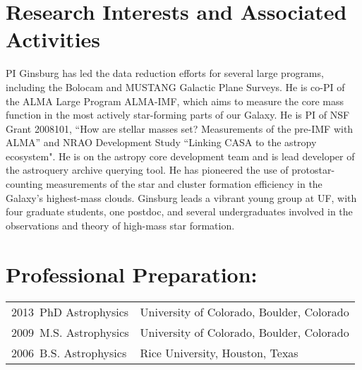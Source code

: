 \documentclass[12pt]{article}
\begin{document}





\section{Research Interests and Associated Activities}
PI Ginsburg has led the data reduction efforts for several large programs, including
the Bolocam and MUSTANG Galactic Plane Surveys.  He is co-PI of the ALMA Large Program
ALMA-IMF, which aims to measure the core mass function in the most actively star-forming
parts of our Galaxy.
He is PI of NSF Grant 2008101, ``How are stellar masses set? Measurements of the pre-IMF with ALMA''
and NRAO Development Study ``Linking CASA to the astropy ecosystem".
He is on the astropy core development team and is lead developer of the astroquery
archive querying tool.  
He has pioneered the use of protostar-counting measurements of the star and cluster
formation efficiency in the Galaxy's highest-mass clouds.
Ginsburg leads a vibrant young group at UF, with four graduate students, one postdoc,
and several undergraduates involved in the observations and theory of high-mass
star formation.

\section{Professional Preparation: }
\begin{tabular} {ll}
    2013~PhD Astrophysics & University of Colorado, Boulder, Colorado \\
    2009~M.S. Astrophysics & University of Colorado, Boulder, Colorado \\
    2006~B.S. Astrophysics & Rice University, Houston, Texas \\
\end{tabular}




\setlength{\extrarowheight}{2pt}
\end{document}

